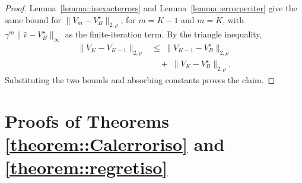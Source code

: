 \documentclass{article}
\theoremstyle{plain}
\theoremstyle{definition}
\theoremstyle{remark}
\begin{document}
\begin{proof}
Lemma~\ref{lemma::inexacterrors} and Lemma~\ref{lemma::errorperiter} give the
same bound for \(\|V_m-V_B^\star\|_{2,\rho}\), for \(m=K-1\) and \(m=K\), with
\(\gamma^m\|\hat v-V_B^\star\|_\infty\) as the finite-iteration term. By the
triangle inequality,
\begin{align*}
\|V_K - V_{K-1}\|_{2,\rho}
&\le\;
\|V_{K-1} - V_B^\star\|_{2,\rho}
\\[0.25em]
&\quad+\;
\|V_K - V_B^\star\|_{2,\rho}.
\end{align*}
Substituting the two bounds and absorbing constants proves the claim.
\end{proof}



\section{Proofs of Theorems \ref{theorem::Calerroriso} and \ref{theorem::regretiso}}
\end{document}
